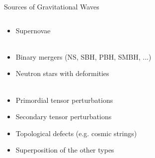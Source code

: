 \begin{frame}{Sources of Gravitational Waves}
\begin{columns}
\begin{column}{.6\linewidth}
\begin{itemize}
	\item<+-> Supernovae \\~\\
\end{itemize}
\begin{itemize}
	\item<5-> Binary mergers (NS, SBH, PBH, SMBH, ...)
	\item<6-> Neutron stars with deformities \\~\\
\end{itemize}
\begin{itemize}[<9->]
	\item<9-> Primordial tensor perturbations
	\item<10-> Secondary tensor perturbations
	\item<11-> Topological defects (e.g. cosmic strings)
	\item<12-> Superposition of the other types
\end{itemize}
\end{column}
\begin{column}{.4\linewidth}

\end{column}
\end{columns}
\end{frame}
